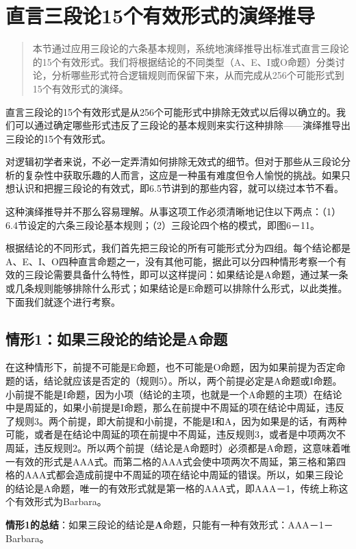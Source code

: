 \section{直言三段论15个有效形式的演绎推导}

\begin{quotation}
本节通过应用三段论的六条基本规则，系统地演绎推导出标准式直言三段论的15个有效形式。我们将根据结论的不同类型（A、E、I或O命题）分类讨论，分析哪些形式符合逻辑规则而保留下来，从而完成从256个可能形式到15个有效形式的演绎。
\end{quotation}

直言三段论的15个有效形式是从256个可能形式中排除无效式以后得以确立的。我们可以通过确定哪些形式违反了三段论的基本规则来实行这种排除——演绎推导出三段论的15个有效形式。

对逻辑初学者来说，不必一定弄清如何排除无效式的细节。但对于那些从三段论分析的复杂性中获取乐趣的人而言，这应是一种虽有难度但令人愉悦的挑战。如果只想认识和把握三段论的有效式，即6.5节讲到的那些内容，就可以绕过本节不看。

这种演绎推导并不那么容易理解。从事这项工作必须清晰地记住以下两点：（1）6.4节设定的六条三段论基本规则；（2）三段论四个格的模式，即图6－11。

根据结论的不同形式，我们首先把三段论的所有可能形式分为四组。每个结论都是A、E、I、O四种直言命题之一，没有其他可能，据此可以分四种情形考察一个有效的三段论需要具备什么特性，即可以这样提问：如果结论是A命题，通过某一条或几条规则能够排除什么形式；如果结论是E命题可以排除什么形式，以此类推。下面我们就逐个进行考察。

\subsection{情形1：如果三段论的结论是$\mathbf{A}$命题}
在这种情形下，前提不可能是E命题，也不可能是O命题，因为如果前提为否定命题的话，结论就应该是否定的（规则5）。所以，两个前提必定是A命题或I命题。小前提不能是I命题，因为小项（结论的主项，也就是一个A命题的主项）在结论中是周延的，如果小前提是I命题，那么在前提中不周延的项在结论中周延，违反了规则3。两个前提，即大前提和小前提，不能是I和A，因为如果是的话，有两种可能，或者是在结论中周延的项在前提中不周延，违反规则3，或者是中项两次不周延，违反规则2。所以两个前提（结论是A命题时）必须都是A命题，这意味着唯一有效的形式是AAA式。而第二格的AAA式会使中项两次不周延，第三格和第四格的AAA式都会造成前提中不周延的项在结论中周延的错误。所以，如果三段论的结论是A命题，唯一的有效形式就是第一格的AAA式，即AAA－1，传统上称这个有效形式为Barbara。

\textbf{情形1的总结}：如果三段论的结论是$\mathbf{A}$命题，只能有一种有效形式：AAA－1－Barbara。

